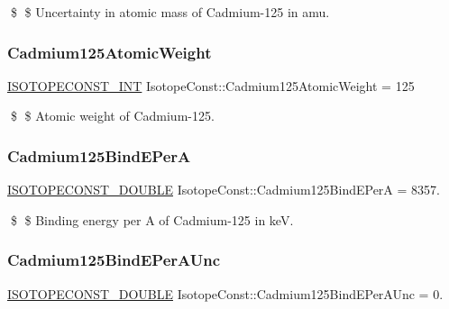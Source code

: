 \$ \$ Uncertainty in atomic mass of Cadmium-\/125 in amu. \mbox{\label{group___isotope_const-_cadmium-_cd125_ga72ad62d4f13276f9b3f45cfdd1a6234d}} 
\subsubsection{\texorpdfstring{Cadmium125\+Atomic\+Weight}{Cadmium125AtomicWeight}}
{\footnotesize\ttfamily \mbox{\hyperlink{group___isotope_const-_macros_ga5f18360b3e99483a35c32d789e62621c}{I\+S\+O\+T\+O\+P\+E\+C\+O\+N\+S\+T\+\_\+\+I\+NT}} Isotope\+Const\+::\+Cadmium125\+Atomic\+Weight = 125}

\$ \$ Atomic weight of Cadmium-\/125. \mbox{\label{group___isotope_const-_cadmium-_cd125_ga326134db977924d3ef60aca75488aa14}} 
\subsubsection{\texorpdfstring{Cadmium125\+Bind\+E\+PerA}{Cadmium125BindEPerA}}
{\footnotesize\ttfamily \mbox{\hyperlink{group___isotope_const-_macros_ga8f45a7272ce02c0b4c65c44636ed719a}{I\+S\+O\+T\+O\+P\+E\+C\+O\+N\+S\+T\+\_\+\+D\+O\+U\+B\+LE}} Isotope\+Const\+::\+Cadmium125\+Bind\+E\+PerA = 8357.}

\$ \$ Binding energy per A of Cadmium-\/125 in keV. \mbox{\label{group___isotope_const-_cadmium-_cd125_ga6265aeec5332fb149f57e40111086b6b}} 
\subsubsection{\texorpdfstring{Cadmium125\+Bind\+E\+Per\+A\+Unc}{Cadmium125BindEPerAUnc}}
{\footnotesize\ttfamily \mbox{\hyperlink{group___isotope_const-_macros_ga8f45a7272ce02c0b4c65c44636ed719a}{I\+S\+O\+T\+O\+P\+E\+C\+O\+N\+S\+T\+\_\+\+D\+O\+U\+B\+LE}} Isotope\+Const\+::\+Cadmium125\+Bind\+E\+Per\+A\+Unc = 0.}

